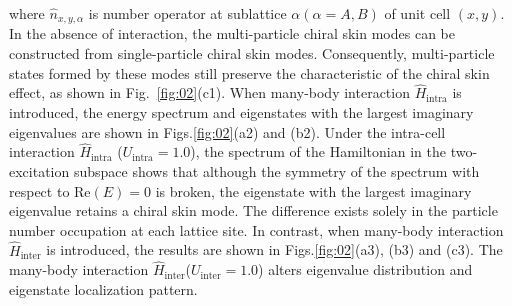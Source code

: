 \documentclass[longbibliography, aps, prx, amsmath, amssymb, amsfonts, twocolumn,superscriptaddress, footinbib]{revtex4-1}
\begin{document}
	where 
	$\hat{n}_{x,y,\alpha}$ is number operator at sublattice $\alpha (\alpha=A,B)$ of unit cell $(x,y)$.
	In the absence of interaction, the multi-particle chiral skin modes can be constructed from single-particle chiral skin modes. Consequently, multi-particle states formed by these modes still preserve the characteristic of the chiral skin effect, as shown in Fig.~\ref{fig:02}(c1).
	When many-body interaction $\hat{H}_{\text{intra}}$ is introduced, the energy spectrum and eigenstates with the largest imaginary eigenvalues are shown in Figs.\ref{fig:02}(a2) and (b2). Under the intra-cell interaction $\hat{H}_{\text{intra}}$ ($U_{\text{intra}}=1.0$), the spectrum of the Hamiltonian in the two-excitation subspace shows that although the symmetry of the spectrum with respect to $\mathrm{Re}(E)=0$ is broken, the eigenstate with the largest imaginary eigenvalue retains a chiral skin mode. 
	The difference exists solely in the particle number occupation at each lattice site. In contrast, when many-body interaction $\hat{H}_{\text{inter}}$ is introduced, the results are shown in Figs.\ref{fig:02}(a3), (b3) and (c3). The many-body interaction $\hat{H}_{\text{inter}}$($U_{\text{inter}}=1.0$) alters eigenvalue distribution and eigenstate localization pattern. 




	
\end{document}
